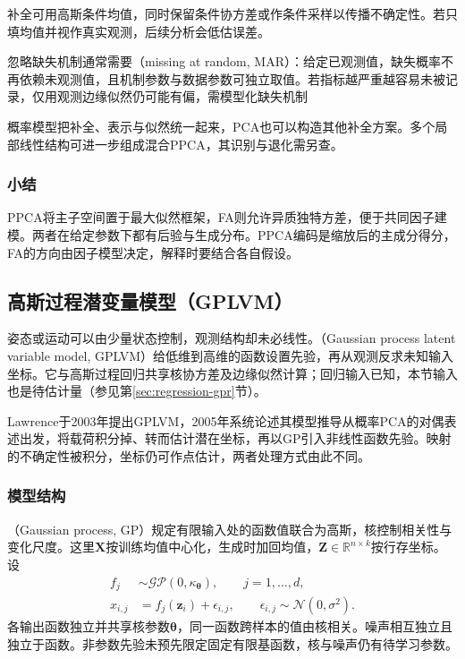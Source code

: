 补全可用高斯条件均值，同时保留条件协方差或作条件采样以传播不确定性。若只填均值并视作真实观测，后续分析会低估误差。

忽略缺失机制通常需要（missing at random, MAR）：给定已观测值，缺失概率不再依赖未观测值，且机制参数与数据参数可独立取值。若指标越严重越容易未被记录，仅用观测边缘似然仍可能有偏，需模型化缺失机制

概率模型把补全、表示与似然统一起来，PCA也可以构造其他补全方案。多个局部线性结构可进一步组成混合PPCA，其识别与退化需另查。

\subsubsection{小结}
\label{sec:dim-ppca-summary}

PPCA将主子空间置于最大似然框架，FA则允许异质独特方差，便于共同因子建模。两者在给定参数下都有后验与生成分布。PPCA编码是缩放后的主成分得分，FA的方向由因子模型决定，解释时要结合各自假设。

\subsection{高斯过程潜变量模型（GPLVM）}
\label{sec:dim-gplvm}

姿态或运动可以由少量状态控制，观测结构却未必线性。（Gaussian process latent variable model, GPLVM）给低维到高维的函数设置先验，再从观测反求未知输入坐标。它与高斯过程回归共享核协方差及边缘似然计算；回归输入已知，本节输入也是待估计量（参见第\ref{sec:regression-gpr}节）。

Lawrence于2003年提出GPLVM，2005年系统论述其模型推导从概率PCA的对偶表述出发，将载荷积分掉、转而估计潜在坐标，再以GP引入非线性函数先验。映射的不确定性被积分，坐标仍可作点估计，两者处理方式由此不同。

\subsubsection{模型结构}
\label{sec:dim-gplvm-structure}

（Gaussian process, GP）规定有限输入处的函数值联合为高斯，核控制相关性与变化尺度。这里$\bm{X}$按训练均值中心化，生成时加回均值，$\bm{Z}\in\mathbb{R}^{n\times k}$按行存坐标。设
\begin{equation}
\label{eq:dim-gplvm-generative}
\begin{aligned}
f_j&\sim\mathcal{GP}(0,\kappa_{\bm{\theta}}),
\qquad j=1,\ldots,d,\\
x_{i,j}&=f_j(\bm{z}_i)+\epsilon_{i,j},
\qquad \epsilon_{i,j}\sim\mathcal{N}(0,\sigma^2).
\end{aligned}
\end{equation}
各输出函数独立并共享核参数$\bm{\theta}$，同一函数跨样本的值由核相关。噪声相互独立且独立于函数。非参数先验未预先限定固定有限基函数，核与噪声仍有待学习参数。

